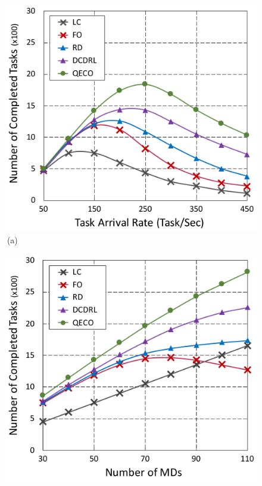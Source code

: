 \documentclass[12pt,draftclsnofoot,onecolumn]{IEEEtran}
\begin{document}
\begin{enumerate}
\begin{figure}[H]\centering
	\captionsetup{name=Fig.}
	\begin{minipage}[b]{0.33\linewidth}
		\centering
		\includegraphics[width=\textwidth]{ drop_1} 
		\textcolor{white}{i}\hspace{0.6cm}(a)
	\end{minipage}
	\hspace{-0.2cm}
	\begin{minipage}[b]{0.33\linewidth}
		\centering
		\includegraphics[width=\textwidth]{ drop_2}

\end{minipage}
\end{figure}
\end{enumerate}
\end{document}
